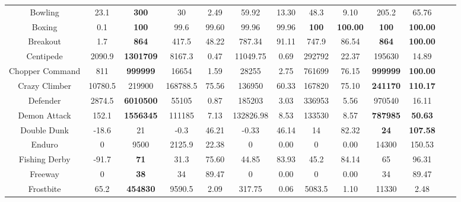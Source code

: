 \documentclass[nohyperref]{article}
\theoremstyle{plain}
\begin{document}
\begin{table}[!hb]
\begin{center}
\begin{tabular}{|c| c| c| c c| c c| c c| c c| c c|}
 Bowling            & 23.1      & \textbf{300}       & 30       &2.49    & 59.92      & 13.30      & 48.3    & 9.10      &205.2             &65.76   \\
 Boxing             & 0.1       & \textbf{100}       & 99.6     &99.60   & 99.96      & 99.96      & \textbf{100}     & \textbf{100.00}     &\textbf{100}               &\textbf{100.00}    \\
 Breakout           & 1.7       & \textbf{864}       & 417.5    &48.22   & 787.34     & 91.11      & 747.9   & 86.54     &\textbf{864}             &\textbf{100.00 }  \\
 Centipede          & 2090.9    & \textbf{1301709}   & 8167.3   &0.47    & 11049.75   & 0.69       & 292792  & 22.37            &195630            &14.89 \\
 Chopper Command    & 811       & \textbf{999999}    & 16654    &1.59    & 28255      & 2.75       & 761699  & 76.15     &\textbf{999999}            &\textbf{100.00}\\
 Crazy Climber      & 10780.5   & 219900    & 168788.5 &75.56   & 136950     & 60.33      & 167820  & 75.10            &\textbf{241170}            &\textbf{110.17}\\
 Defender           & 2874.5    & \textbf{6010500}   & 55105    &0.87    & 185203     & 3.03       & 336953  & 5.56              &970540            &16.11\\
 Demon Attack       & 152.1     & \textbf{1556345}   & 111185   &7.13    & 132826.98  & 8.53       & 133530  & 8.57            &\textbf{787985}   &\textbf{50.63}\\
 Double Dunk        & -18.6     & 21        & -0.3     &46.21   & -0.33      & 46.14      & 14      & 82.32     &\textbf{24}                &\textbf{107.58}  \\
 Enduro             & 0         & 9500      & 2125.9   &22.38   & 0          & 0.00       & 0       & 0.00      &14300             &150.53  \\
 Fishing Derby      & -91.7     & \textbf{71}        & 31.3     &75.60   & 44.85      & 83.93      & 45.2    & 84.14         &65               &96.31\\
 Freeway            & 0         & \textbf{38}        & 34       &89.47   & 0          & 0.00       & 0       & 0.00            &34               &89.47\\
 Frostbite          & 65.2      & \textbf{454830}    & 9590.5   &2.09    & 317.75     & 0.06       & 5083.5  & 1.10              &11330            &2.48 \\

\end{tabular}
\end{center}
\end{table}
\end{document}

